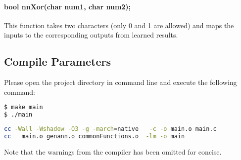 	\paragraph{bool nnXor(char num1, char num2);\\}
	    This function takes two characters (only 0 and 1 are allowed) and maps the inputs to the corresponding outputs from learned results.

	\subsection{Compile Parameters}
	    Please open the project directory in command line and execute the following command:
	    \begin{lstlisting}[language=Bash,caption=Compile Parameters]
$ make main 
$ ./main	     \end{lstlisting}
	    \begin{lstlisting}[language=Bash,caption=Compile Results]
cc -Wall -Wshadow -O3 -g -march=native   -c -o main.o main.c
cc   main.o genann.o commonFunctions.o  -lm -o main	     \end{lstlisting}
Note that the warnings from the compiler has been omitted for concise. 